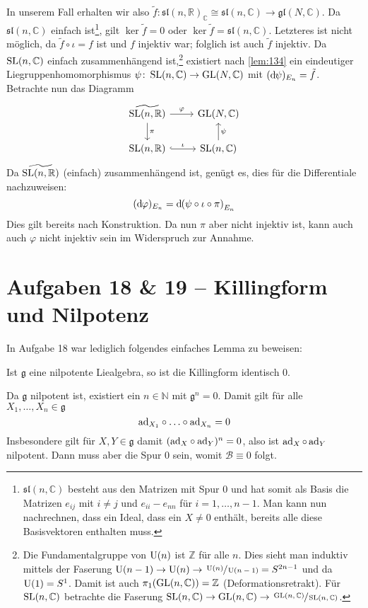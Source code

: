 \begin{beweis}
	In unserem Fall erhalten wir also $\tilde{f} \colon \mathfrak{sl}(n,\mathbb{R})_{\mathbb{C}} \cong \mathfrak{sl}(n,\mathbb{C}) \to \mathfrak{gl}(N,\mathbb{C})$.
	Da $\mathfrak{sl}(n,\mathbb{C})$ einfach ist\footnote{$\mathfrak{sl}(n,\mathbb{C})$ besteht aus den Matrizen mit Spur $0$ und hat somit als Basis die Matrizen $e_{ij}$ mit $i\neq j$ und $e_{ii} - e_{nn}$ für $i=1,\ldots ,n-1$. Man kann nun nachrechnen, dass ein Ideal, dass ein $X\neq 0$ enthält, bereits alle diese Basisvektoren enthalten muss.}, gilt $\ker \tilde{f}=0$ oder $\ker \tilde{f} = \mathfrak{sl}(n,\mathbb{C})$.
	Letzteres ist nicht möglich, da $\tilde{f} \circ \iota = f$ ist und  $f$ injektiv war; folglich ist auch $\tilde{f}$ injektiv.
	Da $\operatorname{SL}(n,\mathbb{C})$ einfach zusammenhängend ist,\footnote{Die Fundamentalgruppe von $\operatorname{U}(n)$ ist $\mathbb{Z}$ für alle $n$. Dies sieht man induktiv mittels der Faserung $\operatorname{U}(n-1) \to \operatorname{U}(n) \to \sfrac{\operatorname{U}(n)}{\operatorname{U}(n-1)} = S^{2n-1}$ und da $\operatorname{U}(1)=S^1$. Damit ist auch $\pi_1(\operatorname{GL}(n,\mathbb{C}))=\mathbb{Z}$ (Deformationsretrakt). Für $\operatorname{SL}(n,\mathbb{C})$ betrachte die Faserung $\operatorname{SL}(n,\mathbb{C}) \to \operatorname{GL}(n,\mathbb{C}) \to \sfrac{\operatorname{GL}(n,\mathbb{C})}{\operatorname{SL}(n,\mathbb{C})}$.} existiert nach \autoref{lem:134} ein eindeutiger Liegruppenhomomorphismus $\psi \colon \operatorname{SL}(n,\mathbb{C}) \to \operatorname{GL}(N,\mathbb{C})$ mit $(\mathrm{d}\mkern-1.0mu \psi)_{E_n} = \tilde{f}$.
	Betrachte nun das Diagramm
	\[
		\begin{tikzcd}
			\widetilde{\SL(n,\mathbb{R})} \rar["\varphi"] \dar["\pi"] & \GL(N,\mathbb{C}) \\
			\SL(n,\mathbb{R}) \rar[hook,"\iota"] & \SL(n,\mathbb{C}) \uar["\psi"']
		\end{tikzcd}
	\]
	Da $\widetilde{\operatorname{SL}(n,\mathbb{R})}$ (einfach) zusammenhängend ist, genügt es, dies für die Differentiale nachzuweisen:
	\[
		(\mathd \varphi)_{E_n} = \mathd \enbrace*{\psi \circ \iota \circ \pi}_{E_n}
	\]
	Dies gilt bereits nach Konstruktion.
	Da nun $\pi$ aber nicht injektiv ist, kann auch auch $\varphi$ nicht injektiv sein im Widerspruch zur Annahme.
\end{beweis}

\section{Aufgaben 18 \& 19 -- Killingform und Nilpotenz} %
\label{sec:aufg18_19}
In Aufgabe 18 war lediglich folgendes einfaches Lemma zu beweisen:
\begin{lemma}
	Ist $\mathfrak{g}$ eine nilpotente Liealgebra, so ist die Killingform identisch $0$.
\end{lemma}
\begin{beweis}
	Da $\mathfrak{g}$ nilpotent ist, existiert ein $n \in \mathbb{N}$ mit $\mathfrak{g}^n =0$.
	Damit gilt für alle $X_1,\ldots ,X_n \in \mathfrak{g}$
	\[
		{\operatorname{ad}_{X_1}} \circ \ldots \circ {\operatorname{ad}_{X_n}} = 0
	\]
	Insbesondere gilt für $X,Y \in \mathfrak{g}$ damit $({\operatorname{ad}_X} \circ {\operatorname{ad}_Y})^n=0$, also ist $\operatorname{ad}_X \circ \operatorname{ad}_Y$ nilpotent.
	Dann muss aber die Spur $0$ sein, womit $\mathcal{B} \equiv 0$ folgt.
\end{beweis}

